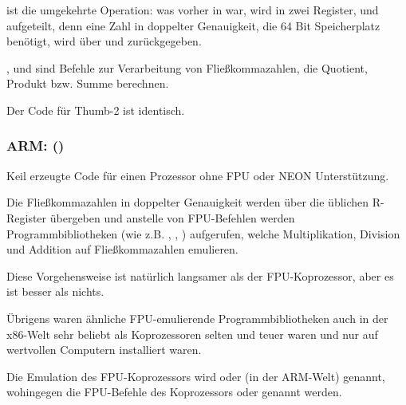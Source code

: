 ist die umgekehrte Operation: was vorher in 
war, wird in zwei Register,  und  aufgeteilt, denn eine Zahl in
doppelter Genauigkeit, die 64 Bit Speicherplatz benötigt, wird über  und
 zurückgegeben.

,  und  sind Befehle zur Verarbeitung von
Fließkommazahlen, die \gls{Quotient}, \gls{Produkt} bzw. \gls{Summe} berechnen.

Der Code für Thumb-2 ist identisch.

\subsubsection{ARM: \OptimizingKeilVI (\ThumbMode)}



Keil erzeugte Code für einen Prozessor ohne FPU oder NEON Unterstützung.

Die Fließkommazahlen in doppelter Genauigkeit werden über die üblichen
R-Register übergeben und anstelle von FPU-Befehlen werden Programmbibliotheken
(wie z.B. , , )
aufgerufen, welche Multiplikation, Division und Addition auf Fließkommazahlen
emulieren. 

Diese Vorgehensweise ist natürlich langsamer als der FPU-Koprozessor, aber es
ist besser als nichts.

Übrigens waren ähnliche FPU-emulierende Programmbibliotheken auch in der
x86-Welt sehr beliebt als Koprozessoren selten und teuer waren und nur auf
wertvollen Computern installiert waren.

Die Emulation des FPU-Koprozessors wird  oder  (in der
ARM-Welt) genannt, wohingegen die FPU-Befehle des Koprozessors 
oder  genannt werden.

\iffalse
\myindex{Raspberry Pi}
Der Linux Kernel des Raspberry Pi beispielsweise wird in zwei Varianten
kompiliert.

Im Falle von \IT{soft float} werden Parameter über R-Register übergeben und im
Falle von \IT{hard float} über D-Register.

Diese Tatsache hält einen davon ab armhf-Programmbibliotheken für armel-Code
oder umgekehrt zu verwenden und dies ist der Grund warum der gesamte Code in
Linux-Distributionen speziell für eine der beiden Konventionen kompiliert wird.
\fi

